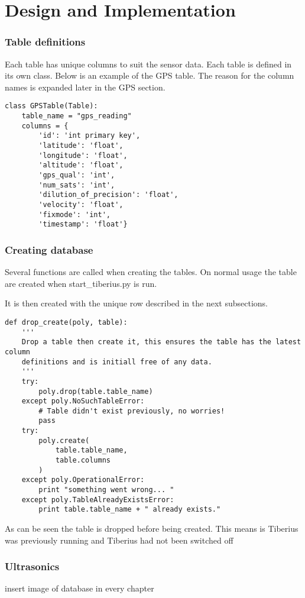 \section{Design and Implementation}

\subsubsection{Table definitions}
Each table has unique columns to suit the sensor data.
Each table is defined in its own class.
Below is an example of the GPS table. The reason for the column names is expanded later in the GPS section.
\begin{lstlisting}     
class GPSTable(Table):
    table_name = "gps_reading"
    columns = {
        'id': 'int primary key',
        'latitude': 'float',
        'longitude': 'float',
        'altitude': 'float',
        'gps_qual': 'int',
        'num_sats': 'int',
        'dilution_of_precision': 'float',
        'velocity': 'float',
        'fixmode': 'int',
        'timestamp': 'float'}
\end{lstlisting} 


\subsubsection{Creating database}
Several functions are called when creating the tables. On normal usage the table are created when start_tiberius.py is run. 



It is then created with the unique row described in the next subsections.

\begin{lstlisting}       
def drop_create(poly, table):
    '''
    Drop a table then create it, this ensures the table has the latest column
    definitions and is initiall free of any data.
    '''
    try:
        poly.drop(table.table_name)
    except poly.NoSuchTableError:
        # Table didn't exist previously, no worries!
        pass
    try:
        poly.create(
            table.table_name,
            table.columns
        )
    except poly.OperationalError:
        print "something went wrong... "
    except poly.TableAlreadyExistsError:
        print table.table_name + " already exists."
\end{lstlisting}  
As can be seen the table is dropped before being created. This means is Tiberius was previously running and Tiberius had not been switched off

\subsubsection{Ultrasonics}
insert image of database in every chapter


